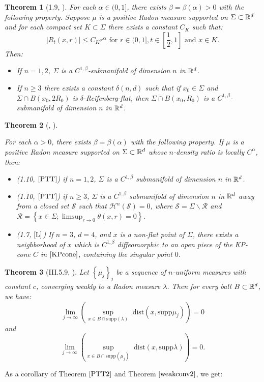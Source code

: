 \documentclass[11pt]{article}
\newtheorem{theorem}{Theorem}[section]
\theoremstyle{definition}
\theoremstyle{remark}
\numberwithin{equation}{section}
\begin{document}
\begin{theorem}[1.9, \cite{PTT}] \label{PTT1}
For each $\alpha \in (0,1]$, there exists $\beta=\beta(\alpha)>0$ with the following property. Suppose $\mu$ is a positive Radon measure supported on $\Sigma \subset \mathbb{R}^{d}$ and for each compact set $K \subset \Sigma $ there exists a constant $C_K$ such that:
\begin{equation}\label{doublingratio}
|R_{t}(x,r)|\leq C_{K} r^{\alpha} \mbox{ for } r \in (0,1], t \in [\frac{1}{2},1] \mbox{ and } x \in K.
\end{equation}
 Then: \begin{itemize}
\item If $n =1,2$,  $\Sigma$ is a $C^{1,\beta}$-submanifold of dimension $n$ in $\mathbb{R}^{d}$.
 \item   If $n\geq 3$ there exists a constant $\delta(n,d)$ such that if $x_0 \in \Sigma$ and $\Sigma \cap B(x_0,2R_0)$ is $\delta$-Reifenberg-flat, then $\Sigma \cap B(x_0,R_0)$ is a $C^{1,\beta}$-submanifold of dimension $n$ in $\mathbb{R}^{d}$.
 \end{itemize}
\end{theorem}
 \begin{theorem} [\cite{PTT}, \cite{L}] \label{PTT2}
 
For each $\alpha >0$, there exists $\beta=\beta(\alpha)$ with the following property. If $\mu$ is a positive Radon measure supported on $\Sigma \subset \mathbb{R}^d$ whose $n$-density ratio is locally $C^{\alpha}$, then:
\begin{itemize}
\item(1.10, $\cite{PTT}$) if $n=1,2$, $\Sigma$ is a $C^{1,\beta}$ submanifold of dimension $n$ in $\mathbb{R}^{d}$.
\item(1.10, $\cite{PTT}$) if $n \geq 3$, $\Sigma$ is a $C^{1,\beta}$ submanifold of dimension $n$ in $\mathbb{R}^{d}$ away from a closed set $\mathcal{S}$ such that $\mathcal{H}^{n}(\mathcal{S})=0$, where  $\mathcal{S}=\Sigma \backslash \mathcal{R}$ and $\mathcal{R}= \left\lbrace x \in \Sigma ; \limsup_{r \to 0} \theta(x,r) = 0 \right\rbrace$.
\item (1.7, $\cite{L}$) If $n=3$, $d=4$, and $x$ is a non-flat point of $\Sigma$, there exists a neighborhood of $x$ which is $C^{1,\beta}$ diffeomorphic to an open piece of the KP-cone $C$ in $\eqref{KPcone}$, containing the singular point $0$.
\end{itemize}
 \end{theorem}
 
 \begin{theorem}[III.5.9, \cite{DS}] \label{weakconv2}
 Let $\left\lbrace \mu_{j} \right\rbrace_{j}$ be a sequence of $n$-uniform measures with constant $c$, converging weakly to a Radon measure $\lambda$. Then for every ball $B \subset \mathbb{R}^{d}$, we have: 
 $$ \lim_{j \to \infty} \left(\sup_{x \in B \cap \mbox{supp}(\lambda)} \mbox{ dist}(x,\mbox{supp}\mu_j) \right) = 0 $$ and
 $$\lim_{j \to \infty} \left(\sup_{x \in B \cap \mbox{supp}(\mu_j)} \mbox{ dist}(x,\mbox{supp}\lambda) \right) = 0.$$
 \end{theorem}
As a corollary of Theorem $\ref{PTT2}$ and Theorem $\ref{weakconv2}$, we get:
\end{document}
